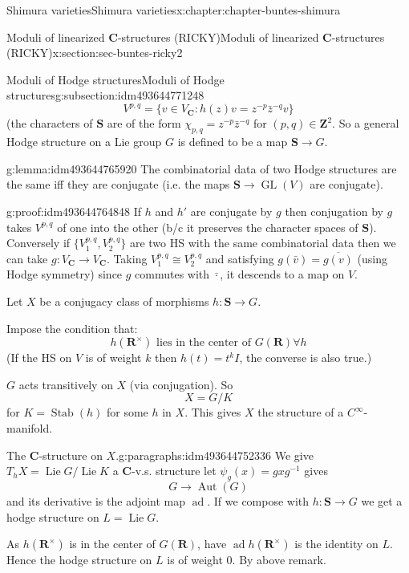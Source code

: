 \documentclass[oneside,10pt,]{book}
\numberwithin{equation}{section}
\DeclareMathOperator{\Lie}{Lie}
\newcommand{\inv}{^{-1}}
\newcommand{\ZZ}{\mathbf{Z}}
\newcommand{\RR}{\mathbf{R}}
\newcommand{\CC}{\mathbf{C}}
\DeclareMathOperator{\Stab}{Stab}
\DeclareMathOperator{\ad}{ad}
\DeclareMathOperator{\Aut}{Aut}
\DeclareMathOperator{\GL}{GL}
\begin{document}
\begin{chapterptx}{Shimura varieties}{}{Shimura varieties}{}{}{x:chapter:chapter-buntes-shimura}
\begin{sectionptx}{Moduli of linearized \(\CC\)-structures (RICKY)}{}{Moduli of linearized \(\CC\)-structures (RICKY)}{}{}{x:section:sec-buntes-ricky2}
\begin{subsectionptx}{Moduli of Hodge structures}{}{Moduli of Hodge structures}{}{}{g:subsection:idm493644771248}
\begin{equation*}
V^{p,q} = \{ v \in V_\CC : h(z) v= z^{-p} \bar z ^{-q} v\}
\end{equation*}
(the characters of \(\mathbf S\) are of the form \(\chi_{p,q} = z^{-p} \bar z ^{-q}\) for \((p,q)\in \ZZ^2\). So a general Hodge structure on a Lie group  \(G\) is defined to be a map \(\mathbf S \to G\).%
\begin{lemma}{}{}{g:lemma:idm493644765920}%
The combinatorial data of two Hodge structures are the same iff they are conjugate (i.e. the maps \(\mathbf S \to \GL(V)\) are conjugate).%
\end{lemma}
\begin{proofptx}{}{g:proof:idm493644764848}
If \(h\) and \(h'\) are conjugate by \(g\) then conjugation by \(g\) takes \(V^{p,q}\) of one into the other (b\slash{}c it preserves the character spaces of \(\mathbf S\)). Conversely if \(\{V_1^{p,q}, V_2^{p,q}\}\) are two HS with the same combinatorial data then we can take \(g \colon V_{\CC} \to V_{\CC}\). Taking \(V_1^{p,q} \cong V_2^{p,q}\) and satisfying \(g(\bar v) = \overline{g(v)}\) (using Hodge symmetry) since \(g\) commutes with \(\bar \cdot\), it descends to a  map on \(V\).%
\end{proofptx}
Let  \(X\) be a conjugacy class of morphisms \(h\colon \mathbf S \to G\).%
\par
Impose the condition that:%
\begin{equation}
h(\RR^\times) \text{ lies in the center of }G(\RR) \forall h\label{g:men:idm493644757456}
\end{equation}
(If the HS on \(V\) is of weight \(k\) then \(h(t) = t^k I\), the converse is also true.)%
\par
\(G\) acts transitively on \(X\) (via conjugation). So%
\begin{equation*}
X=  G/K
\end{equation*}
for \(K = \Stab(h) \) for some \(h\) in \(X\). This gives \(X\) the structure of a \(C^\infty\)-manifold.%
\begin{paragraphs}{The \(\CC\)-structure on \(X\).}{g:paragraphs:idm493644752336}%
We give \(T_hX = \Lie G / \Lie K\) a \(\CC\)-v.s. structure let \(\psi_g (x)  = g x g \inv\) gives%
\begin{equation*}
G\to \Aut(G)
\end{equation*}
and its derivative is the adjoint map \(\ad\). If we compose with \(h \colon \mathbf S\to G\) we get a hodge structure on \(L=  \Lie G\).%
\par
As \(h(\RR^\times)\) is in the center of \(G(\RR)\), have \(\ad h(\RR^\times)\) is the identity on \(L\). Hence the hodge structure on \(L\) is of weight 0. By above remark.%

\end{paragraphs}
\end{subsectionptx}
\end{sectionptx}
\end{chapterptx}
\end{document}
